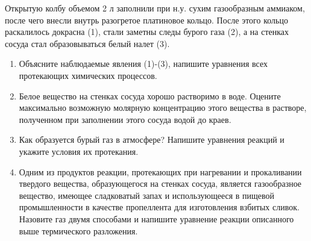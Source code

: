 
Открытую колбу объемом 2 л заполнили при н.у. сухим газообразным аммиаком, после чего внесли внутрь 
разогретое платиновое кольцо. После этого кольцо раскалилось докрасна (1), стали заметны следы бурого газа 
(2), а на стенках сосуда стал образовываться белый налет (3).

\begin{enumerate}
    \item Объясните наблюдаемые явления (1)-(3), напишите уравнения всех протекающих химических процессов.
    \item Белое вещество на стенках сосуда хорошо растворимо в воде. Оцените максимально возможную молярную 
    концентрацию этого вещества в растворе, полученном при заполнении этого сосуда водой до краев.
    \item Как образуется бурый газ в атмосфере? Напишите уравнения реакций и укажите условия их протекания.
    \item Одним из продуктов реакции, протекающих при нагревании и прокаливании твердого вещества, 
    образующегося на стенках сосуда, является газообразное вещество, имеющее сладковатый запах и 
    использующееся в пищевой промышленности в качестве пропеллента для изготовления взбитых сливок. 
    Назовите газ двумя способами и напишите уравнение реакции описанного выше термического разложения.
\end{enumerate}